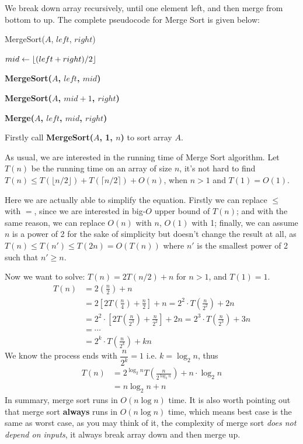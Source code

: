 \documentclass[11pt, a4paper]{COMP3711}
\begin{document}
\begin{spacing}{1.5}
    We break down array recursively, until one element left,
    and then merge from bottom to up.
    The complete pseudocode for Merge Sort is given below:
    \begin{algorithm}
        \caption{MergeSort($A$, $left$, $right$)}
        $mid\leftarrow \lfloor (left + right) / 2 \rfloor$


        {\bf MergeSort($A$, $left$, $mid$)}

        {\bf MergeSort($A$, $mid+1$, $right$)}


        {\bf Merge($A$, $left$, $mid$, $right$)}
    \end{algorithm}

    Firstly call {\bf MergeSort($A$, 1, $n$)} to sort array $A$.
    
    As usual, we are interested in the running time of Merge Sort 
    algorithm. Let $T(n)$ be the running time on an array of size $n$,
    it's not hard to find 
    $T(n)\le T(\lfloor n/2 \rfloor) + T(\lceil n/2 \rceil)+O(n)$,
    when $n>1$ and $T(1)=O(1)$.

    Here we are actually able to simplify the equation. Firstly 
    we can replace $\le $ with $=$, since we are interested
    in big-$O$ upper bound of $T(n)$; and with the same 
    reason, we can replace $O(n)$ with $n$, $O(1)$ with 1;
    finally, we can assume $n$ is a power of 2 for the sake of 
    simplicity but doesn't change the result at all, as 
    $T(n)\le T(n')\le T(2n)=O(T(n))$ where $n'$ is the 
    smallest power of 2 such that $n'\ge n$.

    Now we want to solve: 
    $T(n)=2T(n/2)+n$ for $n>1$, and $T(1)=1$.
    \begin{align*}
        T(n) &= 2\left(\frac{n}{2}\right)+n\\
             &= 2\left[ 2T\left(\frac{n}{4}\right) +\frac{n}{2}\right] + n
              = 2^2\cdot T\left(\frac{n}{2^2}\right) +2n\\
             &= 2^2\cdot \left[ 2T\left(\frac{n}{2^3}\right) +\frac{n}{2^2}\right] + 2n
              = 2^3\cdot T\left(\frac{n}{2^3}\right) +3n\\
             &= \cdots\\
             &= 2^{k}\cdot T\left(\frac{n}{2^k}\right) +kn
    \end{align*}
    We know the process ends with $\dfrac{n}{2^k}=1$ i.e. $k=\log_2 n$, thus
    \begin{align*}
        T(n) &= 2^{\log_2 n}T\left(\frac{n}{2^{\log_2 n}}\right)+n\cdot \log_2 n\\
             &= n\log_2 n+n
    \end{align*}
    In summary, merge sort runs in $O(n\log n)$ time.
    It is also worth pointing out that merge sort {\bf always}
    runs in $O(n\log n)$ time, which means best case is the same 
    as worst case, as you may think of it, 
    the complexity of merge sort {\it does not depend on inputs},
    it always break array down and then merge up.


\end{spacing}
\end{document}
